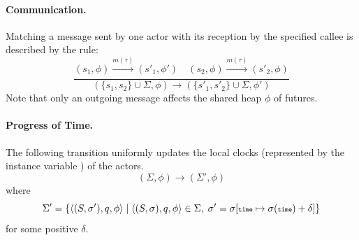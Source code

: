 \paragraph*{Communication.} 
Matching a  message sent by one actor with its  reception by  the specified callee
is described by the rule:
$$
\frac
{(s_1, \phi) \xrightarrow[]{m(\tau)} (s'_1, \phi')\quad (s_2, \phi) \xrightarrow[]{m(\tau)} (s'_2, \phi) }
{(\{s_1,s_2\}\cup\Sigma, \phi) \rightarrow (\{s'_1 , s'_2 \} \cup \Sigma, \phi')}
$$
Note that only an outgoing message affects the shared heap $\phi$ of futures.

\paragraph*{Progress of Time.}
The following transition uniformly updates the local clocks (represented by the instance variable )
of the actors.
$$
(\Sigma,\phi)\rightarrow (\Sigma',\phi)
$$
where
$$
\Sigma'=\{\langle (S,\sigma'), q, \phi\rangle\mid
\langle (S,\sigma), q, \phi\rangle\in \Sigma,\; \sigma'=\sigma [{\scriptsize\texttt{time}}\mapsto \sigma({\scriptsize\texttt{time}})+\delta]\}
$$
for some positive $\delta$.


% 
% 



